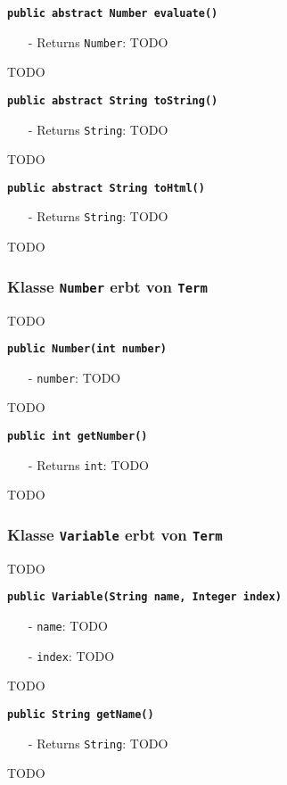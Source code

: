 \documentclass[parskip=full,11pt,twoside]{scrartcl}
\begin{document}
\textbf{\texttt{public abstract Number evaluate()}}
\begin{itemize}[noitemsep]
	\item[-] Returns \texttt{Number}: TODO
\end{itemize}
TODO

\textbf{\texttt{public abstract String toString()}}
\begin{itemize}[noitemsep]
	\item[-] Returns \texttt{String}: TODO
\end{itemize}
TODO

\textbf{\texttt{public abstract String toHtml()}}
\begin{itemize}[noitemsep]
	\item[-] Returns \texttt{String}: TODO
\end{itemize}
TODO

\subsubsection{Klasse \texttt{Number} erbt von \texttt{Term}}
TODO

\textbf{\texttt{public Number(int number)}}
\begin{itemize}[noitemsep]
	\item[-] \texttt{number}: TODO
\end{itemize}
TODO

\textbf{\texttt{public int getNumber()}}
\begin{itemize}[noitemsep]
	\item[-] Returns \texttt{int}: TODO
\end{itemize}
TODO

\subsubsection{Klasse \texttt{Variable} erbt von \texttt{Term}}
TODO

\textbf{\texttt{public Variable(String name, Integer index)}}
\begin{itemize}[noitemsep]
	\item[-] \texttt{name}: TODO
	\item[-] \texttt{index}: TODO
\end{itemize}
TODO

\textbf{\texttt{public String getName()}}
\begin{itemize}[noitemsep]
	\item[-] Returns \texttt{String}: TODO
\end{itemize}
TODO
\end{document}
